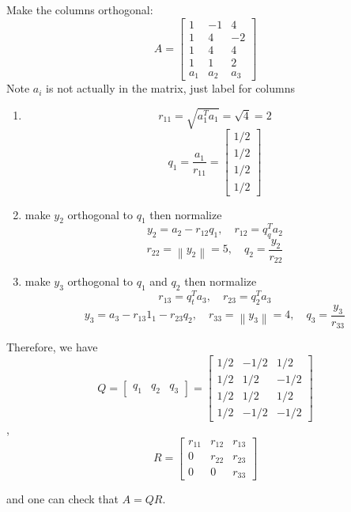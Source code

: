 \documentclass[11pt]{article}
\begin{document}
\begin{example}
    Make the columns orthogonal:
    \[
        A = \begin{bmatrix}
            1&-1&4\\
            1 & 4 & -2\\
            1 & 4 & 4\\
            1 & 1 & 2\\
            a_1 & a_2 & a_3
        \end{bmatrix}
    \]
    Note $a_i$ is not actually in the matrix, just label for columns
    \begin{enumerate}
        \item 
        \[
            r_{11} = \sqrt{a_1^Ta_1} = \sqrt{4} = 2
        \]
        \[
            q_1 = \frac{a_1}{r_{11}} = \begin{bmatrix}
                1/2 \\ 1/2 \\ 1/2 \\ 1/2
            \end{bmatrix}
        \]
        
        \item make $y_2$ orthogonal to $q_1$ then normalize
        \[
            y_2 = a_2 - r_{12}q_1, \quad r_{12} = q_q^T a_2
        \]
        \[
            r_{22} = \left\|y_2\right\|= 5, \quad q_2 = \frac{y_2}{r_{22}}
        \]
        \item make $y_3$ orthogonal to $q_1$ and $q_2$ then normalize
        \[
            r_{13} = q_t^T a_3, \quad r_{23} = q_2^Ta_3
        \]
        \[
            y_3 = a_3 - r_{13}1_1 - r_{23}q_2, \quad r_{33} = \left\|y_3\right\| = 4, \quad q_3 = \frac{y_3}{r_{33}}
        \]
        
    \end{enumerate}
    Therefore, we have
    \[
    Q = 
        \begin{bmatrix}
            q_1 & q_2 & q_3
        \end{bmatrix}
        =
        \begin{bmatrix}
            1/2 & -1/2 & 1/2\\
            1/2 & 1/2 & -1/2 \\
            1/2 & 1/2 & 1/2\\
            1/2 & -1/2 & -1/2
        \end{bmatrix}
    \],
    \[
        R = \begin{bmatrix}
            r_{11} & r_{12} & r_{13}\\
            0 & r_{22} & r_{23}\\
            0 & 0 & r_{33}
        \end{bmatrix}
    \]
    
    and one can check that $A = QR$.
\end{example}
\end{document}
